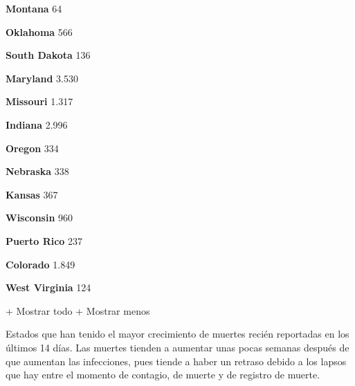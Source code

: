 \textbf{Montana} 64

\href{https://www.nytimes3xbfgragh.onion/interactive/2020/us/oklahoma-coronavirus-cases.html}{}

\textbf{Oklahoma} 566

\href{https://www.nytimes3xbfgragh.onion/interactive/2020/us/south-dakota-coronavirus-cases.html}{}

\textbf{South Dakota} 136

\href{https://www.nytimes3xbfgragh.onion/interactive/2020/us/maryland-coronavirus-cases.html}{}

\textbf{Maryland} 3.530

\href{https://www.nytimes3xbfgragh.onion/interactive/2020/us/missouri-coronavirus-cases.html}{}

\textbf{Missouri} 1.317

\href{https://www.nytimes3xbfgragh.onion/interactive/2020/us/indiana-coronavirus-cases.html}{}

\textbf{Indiana} 2.996

\href{https://www.nytimes3xbfgragh.onion/interactive/2020/us/oregon-coronavirus-cases.html}{}

\textbf{Oregon} 334

\href{https://www.nytimes3xbfgragh.onion/interactive/2020/us/nebraska-coronavirus-cases.html}{}

\textbf{Nebraska} 338

\href{https://www.nytimes3xbfgragh.onion/interactive/2020/us/kansas-coronavirus-cases.html}{}

\textbf{Kansas} 367

\href{https://www.nytimes3xbfgragh.onion/interactive/2020/us/wisconsin-coronavirus-cases.html}{}

\textbf{Wisconsin} 960

\href{https://www.nytimes3xbfgragh.onion/interactive/2020/us/puerto-rico-coronavirus-cases.html}{}

\textbf{Puerto Rico} 237

\href{https://www.nytimes3xbfgragh.onion/interactive/2020/us/colorado-coronavirus-cases.html}{}

\textbf{Colorado} 1.849

\href{https://www.nytimes3xbfgragh.onion/interactive/2020/us/west-virginia-coronavirus-cases.html}{}

\textbf{West Virginia} 124

+ Mostrar todo + Mostrar menos

Estados que han tenido el mayor crecimiento de muertes recién reportadas
en los últimos 14 días. Las muertes tienden a aumentar unas pocas
semanas después de que aumentan las infecciones, pues tiende a haber un
retraso debido a los lapsos que hay entre el momento de contagio, de
muerte y de registro de muerte.

